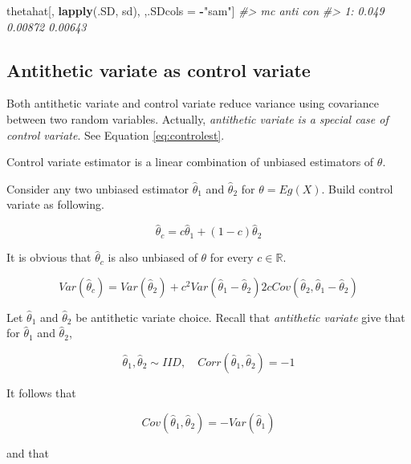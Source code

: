 \documentclass[]{book}
\newenvironment{Shaded}{\begin{snugshade}}{\end{snugshade}}
\newcommand{\CommentTok}[1]{\textcolor[rgb]{0.56,0.35,0.01}{\textit{#1}}}
\newcommand{\KeywordTok}[1]{\textcolor[rgb]{0.13,0.29,0.53}{\textbf{#1}}}
\newcommand{\NormalTok}[1]{#1}
\newcommand{\OperatorTok}[1]{\textcolor[rgb]{0.81,0.36,0.00}{\textbf{#1}}}
\newcommand{\StringTok}[1]{\textcolor[rgb]{0.31,0.60,0.02}{#1}}
\theoremstyle{definition}
\theoremstyle{definition}
\theoremstyle{definition}
\theoremstyle{remark}
\let\BeginKnitrBlock\begin \let\EndKnitrBlock\end
\begin{document}
\begin{Shaded}
\begin{Highlighting}[]
\NormalTok{thetahat[,}
         \KeywordTok{lapply}\NormalTok{(.SD, sd),}
\NormalTok{         ,.SDcols =}\StringTok{ }\OperatorTok{-}\StringTok{"sam"}\NormalTok{]}
\CommentTok{#>       mc    anti     con}
\CommentTok{#> 1: 0.049 0.00872 0.00643}
\end{Highlighting}
\end{Shaded}

\hypertarget{antithetic-variate-as-control-variate}{%
\subsection{Antithetic variate as control variate}\label{antithetic-variate-as-control-variate}}

Both antithetic variate and control variate reduce variance using covariance between two random variables. Actually, \emph{antithetic variate is a special case of control variate}. See Equation \eqref{eq:controlest}.

\BeginKnitrBlock{lemma}
\protect\hypertarget{lem:unnamed-chunk-64}{}{\label{lem:unnamed-chunk-64} }Control variate estimator is a linear combination of unbiased estimators of \(\theta\).
\EndKnitrBlock{lemma}

Consider any two unbiased estimator \(\hat\theta_1\) and \(\hat\theta_2\) for \(\theta = Eg(X)\). Build control variate as following.

\[\hat\theta_c = c\hat\theta_1 + (1 - c)\hat\theta_2\]

It is obvious that \(\hat\theta_c\) is also unbiased of \(\theta\) for every \(c \in \mathbb{R}\).

\begin{equation}
  Var(\hat\theta_c) = Var(\hat\theta_2) + c^2 Var(\hat\theta_1 - \hat\theta_2) 2c Cov(\hat\theta_2, \hat\theta_1 - \hat\theta_2)
  \label{eq:controlvar2}
\end{equation}

Let \(\hat\theta_1\) and \(\hat\theta_2\) be antithetic variate choice. Recall that \emph{antithetic variate} give that for \(\hat\theta_1\) and \(\hat\theta_2\),

\[\hat\theta_1, \hat\theta_2 \sim IID, \quad Corr(\hat\theta_1, \hat\theta_2) = -1\]

It follows that

\[Cov(\hat\theta_1, \hat\theta_2) = - Var(\hat\theta_1)\]

and that
\end{document}

